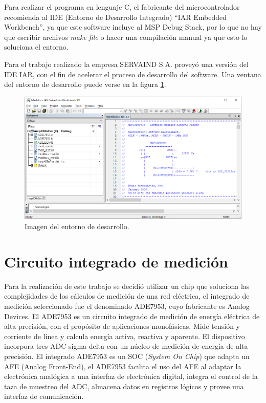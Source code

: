 
Para realizar el programa en lenguaje C, el fabricante del microcontrolador recomienda al IDE (Entorno de Desarrollo Integrado) \textquotedblleft IAR Embedded Workbench\textquotedblright , ya que este software incluye al  MSP Debug Stack, por lo que no hay que escribir archivos \textit{ make file} o hacer una compilación manual ya que esto lo soluciona el entorno.

Para el trabajo realizado la empresa SERVAIND S.A. proveyó una versión del IDE IAR, con el fin de acelerar el proceso de desarrollo del software. Una ventana del entorno de desarrollo puede verse en la figura \ref{fig:IARwindow}.

\begin{figure}[h]
	\centering
	\includegraphics[width=\textwidth,keepaspectratio]{Figures/Embeddedworkbench.png}
	\caption{Imagen del entorno de desarrollo.}
	\label{fig:IARwindow}
\end{figure}



\section{Circuito integrado de medición}
\label{sec:cap2parte3}

Para la realización de este trabajo se decidió utilizar un chip que soluciona las complejidades de los cálculos de medición de una red eléctrica, el integrado de medición seleccionado fue el denominado ADE7953, cuyo fabricante es Analog Devices. El ADE7953 es un circuito integrado de medición de energía eléctrica de alta precisión, con el propósito de aplicaciones monofásicas. Mide tensión y corriente de línea y calcula energía activa, reactiva y aparente. El dispositivo incorpora tres ADC sigma-delta con un núcleo de medición de energía de alta precisión. El integrado ADE7953 es un SOC (\textit{System On Chip}) que adapta un AFE (Analog Front-End), el ADE7953 facilita el uso del AFE al adaptar la electrónica analógica a una interfaz de electrónica digital, integra el control de la taza de muestreo del ADC, almacena datos en registros lógicos y provee una interfaz de comunicación.


